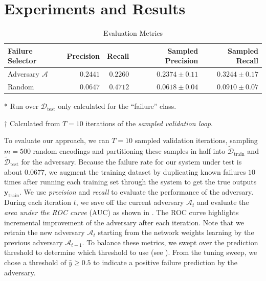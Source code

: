 \section{Experiments and Results}\label{sec:weakness_experiments}
\begin{table}[b]
    \small
    \centering
    \caption{Evaluation Metrics}\label{tab:metrics}
    \begin{threeparttable}
    \begin{tabular}{@{}lrr|rr@{}}
         \toprule
         \textbf{Failure Selector} &  \textbf{Precision}\tnote{*} & \textbf{Recall}\tnote{*} & \textbf{Sampled Precision}\tnote{$\dagger$} & \textbf{Sampled Recall}\tnote{$\dagger$}\\
         \midrule
         Adversary $\mathcal{A}$ & $0.2441$ & $0.2260$ & $0.2374 \pm 0.11$ & $0.3244 \pm 0.17$ \\
         Random & $0.0647$ & $0.4712$ & $0.0618 \pm 0.04$ & $0.0910 \pm 0.07$ \\
         \bottomrule
    \end{tabular}
    \begin{tablenotes}
        \item[*] {Run over $\mathcal{D}_\text{test}$ only calculated for the ``failure'' class.}
        \item[$\dagger$] {Calculated from $T=10$ iterations of the \textit{sampled validation loop}.}
        \end{tablenotes}
    \end{threeparttable}
\end{table}
To evaluate our approach, we ran $T=10$ sampled validation iterations, sampling $m=500$ random encodings and partitioning these samples in half into $\tilde{\mathcal{D}}_\text{train}$ and $\tilde{\mathcal{D}}_\text{test}$ for the adversary.
Because the failure rate for our system under test is about $0.0677$, we augment the training dataset by duplicating known failures $10$ times after running each training set through the system to get the true outputs $\mathbf{y}_\text{train}$.
We use \textit{precision} and \textit{recall} to evaluate the performance of the adversary. During each iteration $t$, we save off the current adversary $\mathcal{A}_t$ and evaluate the \textit{area under the ROC curve} (AUC) as shown in . The ROC curve highlights incremental improvement of the adversary after each iteration. Note that we retrain the new adversary $\mathcal{A}_{t}$ starting from the network weights learning by the previous adversary $\mathcal{A}_{t-1}$.
To balance these metrics, we swept over the prediction threshold to determine which threshold to use (see ).
From the tuning sweep, we chose a threshold of $\hat y \ge 0.5$ to indicate a positive failure prediction by the adversary.

